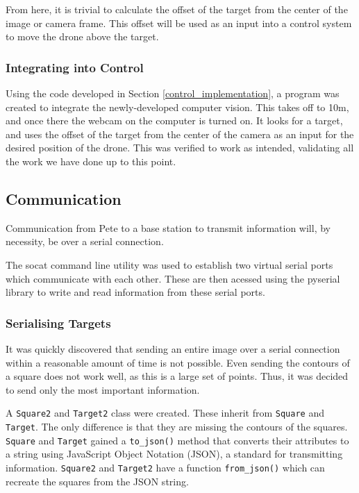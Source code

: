 \documentclass[11pt]{article}
\begin{document}
From here, it is trivial to calculate the offset of the target from the center of the image or camera frame. This offset will be used as an input into a control system to move the drone above the target.

\subsubsection{Integrating into Control}
Using the code developed in Section \ref{control_implementation}, a program was created to integrate the newly-developed computer vision. This takes off to 10m, and once there the webcam on the computer is turned on. It looks for a target, and uses the offset of the target from the center of the camera as an input for the desired position of the drone. This was verified to work as intended, validating all the work we have done up to this point.

\subsection{Communication}
Communication from Pete to a base station to transmit information will, by necessity, be over a serial connection.

The socat command line utility was used to establish two virtual serial ports which communicate with each other. These are then acessed using the pyserial library to write and read information from these serial ports.

\subsubsection{Serialising Targets}
It was quickly discovered that sending an entire image over a serial connection within a reasonable amount of time is not possible. Even sending the contours of a square does not work well, as this is a large set of points. Thus, it was decided to send only the most important information.

A \lstinline|Square2| and \lstinline|Target2| class were created. These inherit from \lstinline|Square| and \lstinline|Target|. The only difference is that they are missing the contours of the squares. \lstinline|Square| and \lstinline|Target| gained a \lstinline|to_json()| method that converts their attributes to a string using JavaScript Object Notation (JSON), a standard for transmitting information. \lstinline|Square2| and \lstinline|Target2| have a function \lstinline|from_json()| which can recreate the squares from the JSON string.
\end{document}
